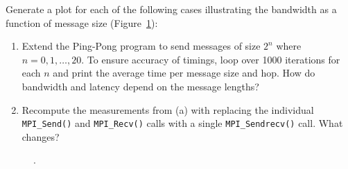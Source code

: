 Generate a plot for each of the following cases illustrating the bandwidth as a function of message size (Figure~\ref{fig:q1}):
\begin{enumerate}
	\item Extend the Ping-Pong program to send messages of size $2^n$ where \mbox{$n = 0,1, \ldots, 20$}. To ensure accuracy of timings, loop over 1000 iterations for each $n$ and print the average time per message size and hop. How do bandwidth and latency depend on the message lengths?
	
	\item Recompute the measurements from (a) with replacing the individual \texttt{MPI\_Send()} and \texttt{MPI\_Recv()} calls with a single \texttt{MPI\_Sendrecv()} call. What changes?
\end{enumerate}

\begin{figure}[h] \centering
  \caption{.}
  \label{fig:q1}
\end{figure}

